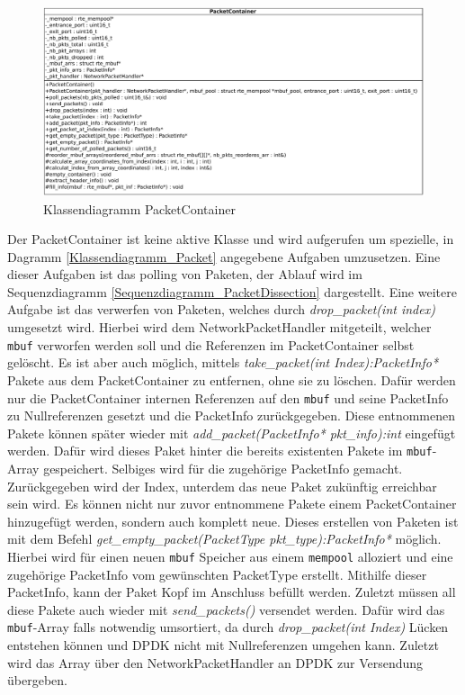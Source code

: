 \documentclass[../review_2.tex]{subfiles}
\begin{document}
\begin{figure}
	\centering
	\includegraphics[width=\linewidth]{img/PacketContainerClass.pdf}
	\caption{Klassendiagramm PacketContainer}
	\label{Klassendiagramm_PacketContainer}
\end{figure}

Der PacketContainer ist keine aktive Klasse und wird aufgerufen um spezielle, in Dagramm \ref{Klassendiagramm_Packet} angegebene Aufgaben umzusetzen. Eine dieser Aufgaben ist das polling von Paketen, der Ablauf wird im Sequenzdiagramm \ref{Sequenzdiagramm_PacketDissection} dargestellt. Eine weitere Aufgabe ist das verwerfen von Paketen, welches durch \textit{drop\_packet(int index)} umgesetzt wird. Hierbei wird dem NetworkPacketHandler mitgeteilt, welcher \texttt{mbuf} verworfen werden soll und die Referenzen im PacketContainer selbst gelöscht. Es ist aber auch möglich, mittels \textit{take\_packet(int Index):PacketInfo*} Pakete aus dem PacketContainer zu entfernen, ohne sie zu löschen. Dafür werden nur die PacketContainer internen Referenzen auf den \texttt{mbuf} und seine PacketInfo zu Nullreferenzen gesetzt und die PacketInfo zurückgegeben. Diese entnommenen Pakete können später wieder mit \textit{add\_packet(PacketInfo* pkt\_info):int} eingefügt werden. Dafür wird dieses Paket hinter die bereits existenten Pakete im \texttt{mbuf}-Array gespeichert. Selbiges wird für die zugehörige PacketInfo gemacht. Zurückgegeben wird der Index, unterdem das neue Paket zukünftig erreichbar sein wird. Es können nicht nur zuvor entnommene Pakete einem PacketContainer hinzugefügt werden, sondern auch komplett neue. Dieses erstellen von Paketen ist mit dem Befehl \textit{get\_empty\_packet(PacketType pkt\_type):PacketInfo*} möglich. Hierbei wird für einen neuen \texttt{mbuf} Speicher aus einem \texttt{mempool} alloziert und eine zugehörige PacketInfo vom gewünschten PacketType erstellt. Mithilfe dieser PacketInfo, kann der Paket Kopf im Anschluss befüllt werden. Zuletzt müssen all diese Pakete auch wieder mit \textit{send\_packets()} versendet werden. Dafür wird das \texttt{mbuf}-Array falls notwendig umsortiert, da durch \textit{drop\_packet(int Index)} Lücken entstehen können und DPDK nicht mit Nullreferenzen umgehen kann. Zuletzt wird das Array über den NetworkPacketHandler an DPDK zur Versendung übergeben.
\end{document}
